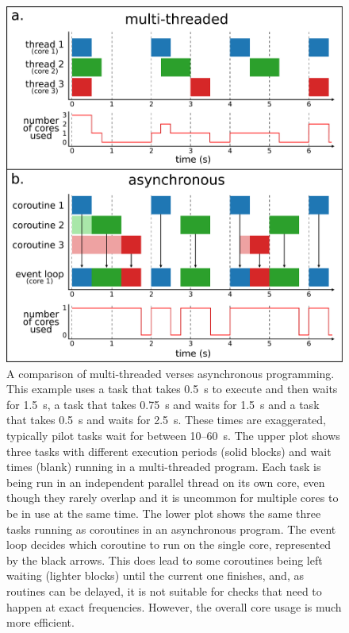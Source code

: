 \begin{colsection}
\begin{figure}[p]
    \begin{center}
        \includegraphics[width=0.89\linewidth]{images/async.pdf}
    \end{center}
    \caption[Multi-threaded verses asynchronous programming]{
        A comparison of multi-threaded verses asynchronous programming. This example uses a  task that takes \SI{0.5}{\second} to execute and then waits for \SI{1.5}{\second}, a  task that takes \SI{0.75}{\second} and waits for \SI{1.5}{\second} and a  task that takes \SI{0.5}{\second} and waits for \SI{2.5}{\second}. These times are exaggerated, typically pilot tasks wait for between 10--\SI{60}{\second}.
        The upper plot shows three tasks with different execution periods (solid blocks) and wait times (blank) running in a multi-threaded program. Each task is being run in an independent parallel thread on its own core, even though they rarely overlap and it is uncommon for multiple cores to be in use at the same time.
        The lower plot shows the same three tasks running as coroutines in an asynchronous program. The event loop decides which coroutine to run on the single core, represented by the black arrows. This does lead to some coroutines being left waiting (lighter blocks) until the current one finishes, and, as routines can be delayed, it is not suitable for checks that need to happen at exact frequencies. However, the overall core usage is much more efficient.
    }\label{fig:async}
\end{figure}


\end{colsection}
